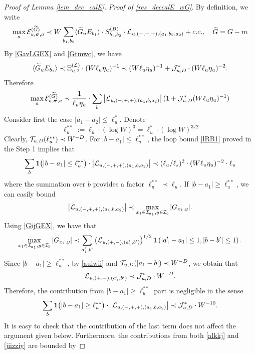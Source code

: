 \documentclass[10pt,reqno]{article}
\theoremstyle{plain} %
\theoremstyle{remark}
\numberwithin{equation}{section}
\begin{document}
\begin{proof}[Proof of Lemma \ref{lem_dec_calE}]
 
\medskip
\noindent 
\emph{Proof of   \eqref{res_deccalE_wG}}.    By definition, we  write 
\begin{align}
 \max_{\textbf{a}}{\cal E}^{(\widetilde G)}_{u,  \boldsymbol{\sigma},  \textbf{a} }
 \prec W \sum_{b_1,b_2} \langle \widetilde G_u E_{b_1}\rangle\cdot S^{(B)}_{b_1,b_2}\cdot  {\cal L}_{u, (-,+,+),(a_1, b_2, a_2)}+c.c.,\quad \widetilde{G}=G-m
 \end{align}
By \eqref{GavLGEX} and \eqref{Gtmwc}, we have 
$$
\langle \widetilde G_u E_{b_1}\rangle\prec \Xi^{(\cal L)}_{u,2}\cdot (W\ell_u\eta_u)^{-1}\prec  (W\ell_u\eta_u)^{-1}+ {\cal J}^*_{u,D}\cdot (W\ell_u\eta_u)^{-2}.
$$
Therefore 
 \begin{align}\label{jiizziy}
\max_{\textbf{a}}{\cal E}^{(\widetilde G)}_{u,  \boldsymbol{\sigma},  \textbf{a} } \prec \frac{1}{ \ell_u\eta_u} \cdot \sum_{b }   \left|{\cal L}_{u, (-,+,+),(a_1, b , a_2)}\right|(1+{\cal J}^*_{u,D}(W\ell_u\eta_u)^{-1})
\end{align}
Consider first the case  $|a_1-a_2|\le \ell_u^*$.  Denote 
$$
\ell_u^{**}:= \ell_u\cdot (\log W)^3=\ell^*_u\cdot (\log W)^{3/2}
$$
Clearly,  ${\cal T}_{u,D}(\ell_u^{**})\prec W^{-D}$. 
For $|b-a_1|\le  \ell_u^{**}$, 
the loop bound \eqref{lRB1}  proved in the Step 1 implies that 
\begin{align}\label{alkkj}
 \sum_{b }{\bf 1}\big(|b-a_1|\le  \ell_u^{** }\big)\cdot  \left|{\cal L}_{u, (-,+,+),(a_1, b , a_2)}\right|\prec (\ell_u/\ell_s)^2\cdot (W\ell_u\eta_u)^{-2} \cdot \ell_u   
\end{align}
where the summation over $b$ provides a factor $ \ell_u^{** } \prec\ell_u$. 
If $|b-a_1|\ge \ell_u^{**}$, we can easily bound 
 $$
 \left|{\cal L}_{u, (-,+,+),(a_1, b , a_2)}\right|\prec \max_{x_1\in {\cal I}_{a_1},y\in {\cal I}_{b}}|G_{x_1,y}|.
$$
Using  \eqref{GijGEX}, we have that 
$$
\max_{x_1\in {\cal I}_{a_1},y\in {\cal I}_{b}}|G_{x_1,y}|\prec \sum_{a_1', b'}\left({\cal L}_{u,(+,-),{(a_1',b')}}\right)^{1/2}{\bf1}\left(|a'_1-a_1|\le 1, |b-b'|\le 1\right).
$$
Since $|b-a_1|\ge \ell_u^{** }$, by  \eqref{auiwii} and ${\cal T}_{u,D}(|a_1-b|)\prec W^{-D}$, we obtain that  
$$
{\cal L}_{u,(+,-),{(a_1',b')}} \prec {\cal J}^*_{u,D}\cdot W^{-D}.
$$
Therefore, the contribution from $|b-a_1|\ge  \ell_u^{** }$ part is negligible in the sense 
\begin{align}\label{alkkj2}
 \sum_{b }{\bf 1}\big(|b-a_1|\ge  \ell_u^{** }\big)\cdot  \left|{\cal L}_{u, (-,+,+),(a_1, b , a_2)}\right|\prec  {\cal J}^*_{u,D}\cdot W^{-10}. 
\end{align}
It  is easy to check that the contribution of the last term does not affect the argument given below.  Furthermore,  the contributions from both  \eqref{alkkj} and  \eqref{jiizziy} are bounded by 

\end{proof}
\end{document}
